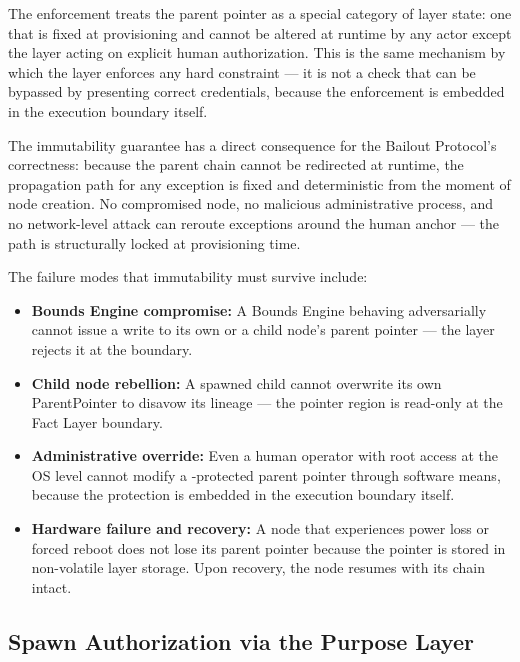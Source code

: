 The enforcement treats the parent pointer as a special category of \fact{} layer state: one that is fixed at provisioning and cannot be altered at runtime by any actor except the \purpose{} layer acting on explicit human authorization. This is the same mechanism by which the \fact{} layer enforces any hard constraint — it is not a check that can be bypassed by presenting correct credentials, because the enforcement is embedded in the execution boundary itself.

The immutability guarantee has a direct consequence for the Bailout Protocol's correctness: because the parent chain cannot be redirected at runtime, the propagation path for any exception is fixed and deterministic from the moment of node creation. No compromised node, no malicious administrative process, and no network-level attack can reroute exceptions around the human anchor — the path is structurally locked at provisioning time.

The failure modes that immutability must survive include:

\begin{itemize}
\item \textbf{Bounds Engine compromise:} A Bounds Engine behaving adversarially cannot issue a write to its own or a child node's parent pointer — the \fact{} layer rejects it at the boundary.
\item \textbf{Child node rebellion:} A spawned child cannot overwrite its own ParentPointer to disavow its lineage — the pointer region is read-only at the Fact Layer boundary.
\item \textbf{Administrative override:} Even a human operator with root access at the OS level cannot modify a \fact{}-protected parent pointer through software means, because the protection is embedded in the execution boundary itself.
\item \textbf{Hardware failure and recovery:} A node that experiences power loss or forced reboot does not lose its parent pointer because the pointer is stored in non-volatile \fact{} layer storage. Upon recovery, the node resumes with its chain intact.
\end{itemize}

\subsection{Spawn Authorization via the Purpose Layer}
\label{sec:spawn-authorization}

